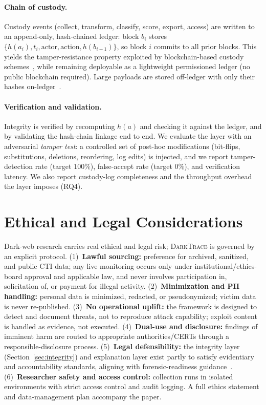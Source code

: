 \documentclass[11pt,a4paper]{article}
\newcommand{\framework}{\textsc{DarkTrace}}
\begin{document}
\paragraph{Chain of custody.} Custody events (collect, transform, classify, score,
export, access) are written to an append-only, hash-chained ledger: block $b_i$ stores
$\{h(a_i), t_i, \text{actor}, \text{action}, h(b_{i-1})\}$, so block $i$ commits to all
prior blocks. This yields the tamper-resistance property exploited by blockchain-based
custody schemes~\cite{lone2019forensicchain,ali2022procedure,loffi2025management}, while
remaining deployable as a lightweight permissioned ledger (no public blockchain
required). Large payloads are stored off-ledger with only their hashes
on-ledger~\cite{loffi2025management}.

\paragraph{Verification and validation.} Integrity is verified by recomputing $h(a)$ and
checking it against the ledger, and by validating the hash-chain linkage end to end. We
evaluate the layer with an adversarial \emph{tamper test}: a controlled set of
post-hoc modifications (bit-flips, substitutions, deletions, reordering, log edits) is
injected, and we report tamper-detection rate (target $100\%$), false-accept rate
(target $0\%$), and verification latency. We also report custody-log completeness and
the throughput overhead the layer imposes (RQ4).

\section{Ethical and Legal Considerations}\label{sec:ethics}

Dark-web research carries real ethical and legal risk; \framework{} is governed by an
explicit protocol. (1)~\textbf{Lawful sourcing:} preference for archived, sanitized, and
public CTI data; any live monitoring occurs only under institutional/ethics-board
approval and applicable law, and never involves participation in, solicitation of, or
payment for illegal activity. (2)~\textbf{Minimization and PII handling:} personal data
is minimized, redacted, or pseudonymized; victim data is never re-published.
(3)~\textbf{No operational uplift:} the framework is designed to detect and document
threats, not to reproduce attack capability; exploit content is handled as evidence, not
executed. (4)~\textbf{Dual-use and disclosure:} findings of imminent harm are routed to
appropriate authorities/CERTs through a responsible-disclosure process. (5)~\textbf{Legal
defensibility:} the integrity layer (Section~\ref{sec:integrity}) and explanation layer
exist partly to satisfy evidentiary and accountability standards, aligning with
forensic-readiness guidance~\cite{nist80086,lone2019forensicchain}. (6)~\textbf{Researcher
safety and access control:} collection runs in isolated environments with strict access
control and audit logging. A full ethics statement and data-management plan accompany the
paper.
\end{document}
